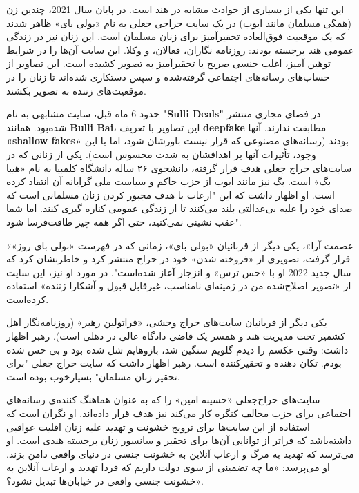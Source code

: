 این تنها یکی از بسیاری از حوادث مشابه در هند است.
در پایان سال 2021، چندین زن (همگی مسلمان مانند ایوب) در یک سایت حراجی جعلی به نام «بولی بای» ظاهر شدند که یک موقعیت فوق‌العاده تحقیرآمیز برای زنان مسلمان است.
این زنان نیز در زندگی عمومی هند برجسته بودند: روزنامه نگاران، فعالان، و وکلا.
این سایت آن‌ها را در شرایط توهین آمیز، اغلب جنسی صریح یا تحقیرآمیز به تصویر کشیده است.
این تصاویر از حساب‌های رسانه‌های اجتماعی گرفته‌شده و سپس دستکاری شده‌اند تا زنان را در موقعیت‌های زننده به تصویر بکشند.

حدود 6 ماه قبل، سایت مشابهی به نام \textenglish{\textbf{"Sulli Deals"}} در فضای مجازی منتشر شده‌بود.
همانند \textenglish{\textbf{Bulli Bai}}، این تصاویر با تعریف \textenglish{\textbf{deepfake}} مطابقت ندارند.
آنها \textenglish{\textbf{«shallow fakes»}} بودند (رسانه‌های مصنوعی که قرار نیست باورشان شود، اما با این وجود، تأثیرات آنها بر اهدافشان به شدت محسوس است).
یکی از زنانی که در سایت‌های حراج جعلی هدف قرار گرفته، دانشجوی ۲۶ ساله دانشگاه کلمبیا به نام «هیبا بگ» است.
بگ نیز مانند ایوب از حزب حاکم و سیاست ملی گرایانه آن انتقاد کرده است.
او اظهار داشت که این "ارعاب با هدف مجبور کردن زنان مسلمانی است که صدای خود را علیه بی‌عدالتی بلند می‌کنند تا از زندگی عمومی کناره گیری کنند.
اما شما عقب نشینی نمی‌کنید، حتی اگر همه چیز طاقت‌فرسا شود".

«عصمت آرا»، یکی دیگر از قربانیان «بولی بای»، زمانی که در فهرست «بولی بای روز» قرار گرفت، تصویری از «فروخته شدن» خود در حراج منتشر کرد و خاطرنشان کرد که سال جدید 2022 او با «حس ترس» و انزجار آعاز شده‌است".
در مورد او نیز، این سایت از «تصویر اصلاح‌شده من در زمینه‌ای نامناسب، غیرقابل قبول و آشکارا زننده» استفاده کرده‌است.

یکی دیگر از قربانیان سایت‌های حراج وحشی، «قراتولین رهبر» (روزنامه‌نگار اهل کشمیر تحت مدیریت هند و همسر یک قاضی دادگاه عالی در دهلی است).
رهبر اظهار داشت: وقتی عکسم را دیدم گلویم سنگین شد، بازوهایم شل شده بود و بی حس شده بودم.
تکان دهنده و تحقیرکننده است.
رهبر اظهار داشت که سایت حراج جعلی "برای تحقیر زنان مسلمان" بسیار‌خوب بوده است.

سایت‌های حراج‌جعلی «حسیبه امین» را که به عنوان هماهنگ کننده‌ی رسانه‌های اجتماعی برای حزب مخالف کنگره کار می‌کند نیز هدف قرار داده‌اند.
او نگران است که استفاده از این سایت‌ها برای ترویج خشونت و تهدید علیه زنان اقلیت عواقبی داشته‌باشد که فراتر از توانایی آن‌ها برای تحقیر و سانسور زنان برجسته هندی است.
او می‌ترسد که تهدید به مرگ و ارعاب آنلاین به خشونت جنسی در دنیای واقعی دامن بزند.
او می‌پرسد: «ما چه تضمینی از سوی دولت داریم که فردا تهدید و ارعاب آنلاین به خشونت جنسی واقعی در خیابان‌ها تبدیل نشود؟».
\newline
\newline
\newline


